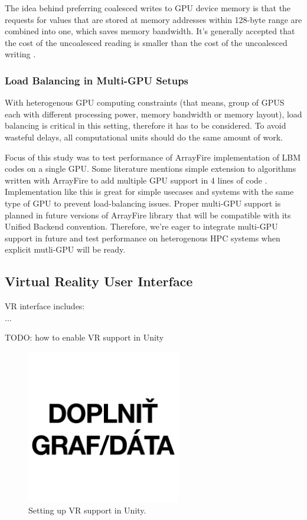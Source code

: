 The idea behind preferring coalesced writes to GPU device memory is that the requests for values that are stored at memory addresses within 128-byte range are combined into one, which saves memory bandwidth. It's generally accepted that the cost of the uncoalesced reading is smaller than the cost of the uncoalesced writing \cite{tranPerformanceOptimization3D2017}.

\subsubsection{Load Balancing in Multi-GPU Setups}
\label{sec:load-balancing}

With heterogenous GPU computing constraints (that means, group of GPUS each with different processing power, memory bandwidth or memory layout), load balancing is critical in this setting, therefore it has to be considered. To avoid wasteful delays, all computational units should do the same amount of work. 

Focus of this study was to test performance of ArrayFire implementation of LBM codes on a single GPU. Some literature mentions simple extension to algorithms written with ArrayFire to add multiple GPU support in 4 lines of code \cite{malcolmArrayFireGPUAcceleration2012a}. Implementation like this is great for simple usecases and systems with the same type of GPU to prevent load-balancing issues. Proper multi-GPU support is planned in future versions of ArrayFire library that will be compatible with its Unified Backend convention. Therefore, we're eager to integrate multi-GPU support in future and test performance on heterogenous HPC systems when explicit mutli-GPU will be ready.


\subsection{Virtual Reality User Interface}

VR interface includes: \\ 

...

TODO: how to enable VR support in Unity

\begin{figure}[!ht]
	\centering
	\includegraphics[width=0.6\textwidth]{figures/empty.jpg}
	\caption{Setting up VR support in Unity.}
	\label{fig:unity-vr-support}
\end{figure}

